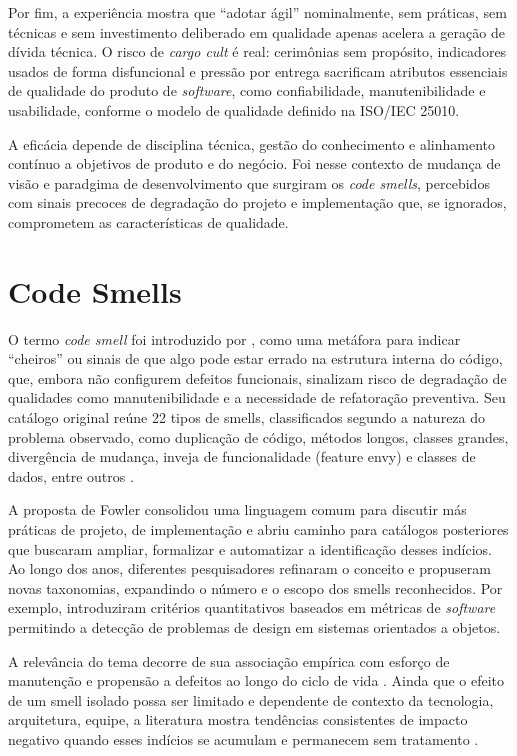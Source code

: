 Por fim, a experiência mostra que “adotar ágil” nominalmente, sem práticas, sem técnicas e sem investimento deliberado em qualidade apenas acelera a 
geração de dívida técnica. O risco de \textit{cargo cult} é real: cerimônias sem propósito, indicadores usados de forma disfuncional e pressão por 
entrega sacrificam atributos essenciais de qualidade do produto de \textit{software}, como confiabilidade, manutenibilidade e usabilidade, conforme o modelo 
de qualidade definido na ISO/IEC 25010.

A eficácia depende de disciplina técnica, 
gestão do conhecimento e alinhamento contínuo a objetivos de produto e do negócio. Foi nesse contexto de mudança de visão e paradgima de desenvolvimento que surgiram os \textit{code smells}, percebidos com sinais precoces de degradação do projeto e implementação que, se ignorados, comprometem as características de qualidade.

\section{Code Smells}

O termo \textit{code smell} foi introduzido por , como uma metáfora para indicar “cheiros” ou sinais 
de que algo pode estar errado na estrutura interna do código, que, embora não configurem 
defeitos funcionais, sinalizam risco de degradação de qualidades como manutenibilidade e a necessidade 
de refatoração preventiva. Seu catálogo original reúne 22 tipos de smells, classificados segundo a natureza do problema 
observado, como duplicação de código, métodos longos, classes grandes, divergência de mudança, inveja de funcionalidade 
(feature envy) e classes de dados, entre outros \cite{Fowler1999}.

A proposta de Fowler consolidou uma linguagem comum para discutir más práticas de projeto, de implementação e abriu caminho 
para catálogos posteriores que buscaram ampliar, formalizar e automatizar a identificação desses indícios. 
Ao longo dos anos, diferentes pesquisadores refinaram o conceito e propuseram novas taxonomias, expandindo o 
número e o escopo dos smells reconhecidos. Por exemplo,  introduziram critérios 
quantitativos baseados em métricas de \textit{software} permitindo a detecção de problemas de design em sistemas orientados a objetos.

A relevância do tema decorre de sua associação empírica com esforço de manutenção e propensão a defeitos ao longo do 
ciclo de vida \cite{Palomba2018}. Ainda que o efeito de um smell isolado possa ser limitado e dependente de contexto da tecnologia, 
arquitetura, equipe, a literatura mostra tendências consistentes de impacto negativo quando esses 
indícios se acumulam e permanecem sem tratamento \cite{Mantyla2003, Sjoberg2013}.

